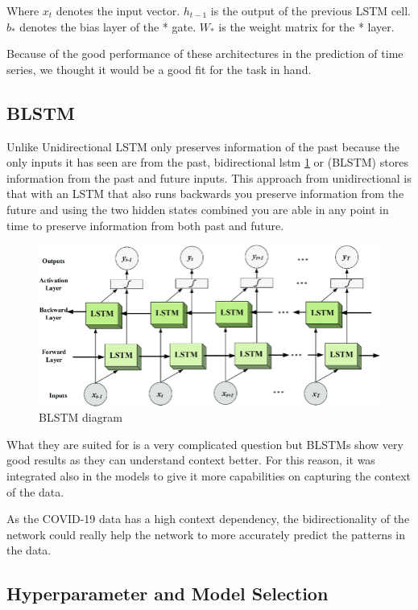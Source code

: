 \documentclass[anon]{CI}
\begin{document}
Where $x_t$ denotes the input vector. $h_{t-1}$ is the output of the previous LSTM cell. $b_*$ denotes the bias layer of the * gate. $W_*$ is the weight matrix for the * layer.

Because of the good performance of these architectures in the prediction of time series, we thought it would be a good fit for the task in hand.

\subsection{BLSTM}

Unlike Unidirectional LSTM only preserves information of the past because the only inputs it has seen are from the past, bidirectional lstm \ref{fig:BLSTM} or (BLSTM) stores information from the past and future inputs. This approach from unidirectional is that with an LSTM that also runs backwards you preserve information from the future and using the two hidden states combined you are able in any point in time to preserve information from both past and future.

\begin{figure}[!ht]
    \center
    \includegraphics[width=\linewidth]{BLSTM.png}
    \caption{\label{fig:BLSTM}BLSTM diagram}
\end{figure}

What they are suited for is a very complicated question but BLSTMs show very good results as they can understand context better. For this reason, it was integrated also in the models to give it more capabilities on capturing the context of the data.

As the COVID-19 data has a high context dependency, the bidirectionality of the network could really help the network to more accurately predict the patterns in the data.

\subsection{Hyperparameter and Model Selection}
\end{document}
